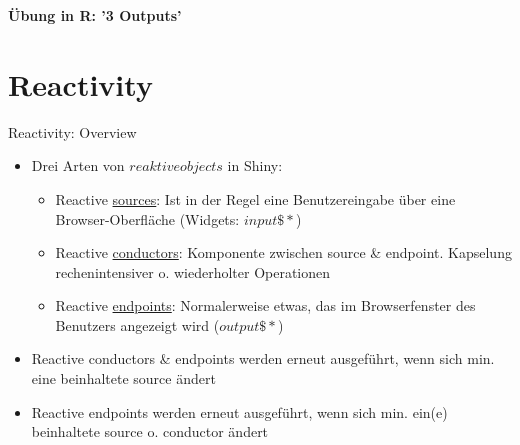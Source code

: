 \documentclass[xcolor=dvipsnames]{beamer}\usepackage[]{graphicx}\usepackage[]{color}
\begin{document}
\begin{frame}{}
  \centering
  \textbf{Übung in R: '3 Outputs'}
\end{frame}



\section{Reactivity} %

\begin{frame}[fragile]{Reactivity: Overview} 
\begin{itemize}
  \item Drei Arten von $reaktive objects$ in Shiny:
    \begin{itemize}
      \item Reactive \underline{sources}: Ist in der Regel eine Benutzereingabe über eine Browser-Oberfläche (Widgets: $input\$*$)
      \item Reactive \underline{conductors}: Komponente zwischen source \& endpoint. Kapselung rechenintensiver o. wiederholter Operationen 
      \item Reactive \underline{endpoints}: Normalerweise etwas, das im Browserfenster des Benutzers angezeigt wird ($output\$*$)
    \end{itemize}
  \item Reactive conductors \& endpoints werden erneut ausgeführt, wenn sich min. eine beinhaltete source ändert
  \item Reactive endpoints werden erneut ausgeführt, wenn sich min. ein(e) beinhaltete source o. conductor ändert
  \end{itemize}  
\end{frame}
\end{document}
